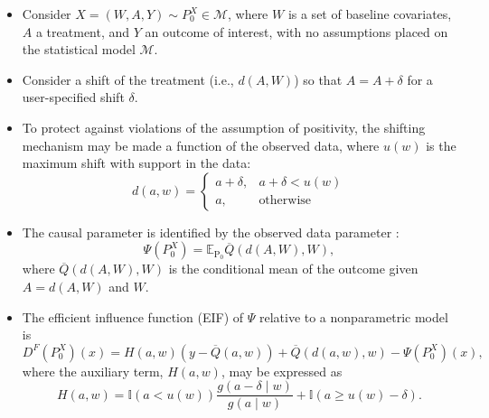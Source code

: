 \documentclass[landscape,a0paper,fontscale=0.285]{baposter} %
\begin{document}
\begin{poster}
{\begin{itemize}
  \itemsep0.75pt
  \item Consider $X = (W, A, Y) \sim P_0^X \in \mathcal{M}$, where $W$ is a set
    of baseline covariates, $A$ a treatment, and $Y$ an outcome of interest,
    with no assumptions placed on the statistical model $\mathcal{M}$.
  \item Consider a shift of the treatment (i.e., $d(A, W)$) so that
    $A = A + \delta$ for a user-specified shift $\delta$.
  \item To protect against violations of the assumption of positivity, the
    shifting mechanism may be made a function of the observed data, where
    $u(w)$ is the maximum shift with support in the data:
    \[ d(a, w) =
       \begin{cases}
         a + \delta, & a + \delta < u(w) \\
         a, & \text{otherwise}
       \end{cases}
    \]
  \item The causal parameter is identified by the observed data parameter
    \cite{munoz2012population}:
    \begin{equation}
      \Psi(P_0^X) = \mathbb{E}_{\text{P}_0}{\overline{Q}(d(A, W), W)},
    \end{equation}
    where $\overline{Q}(d(A, W), W)$ is the conditional mean of the outcome
    given $A = d(A,W)$ and $W$.
  \item The efficient influence function (EIF) of $\Psi$ relative to a
    nonparametric model is
        \begin{equation}
          D^F(P_0^X)(x) = H(a, w)({y - \overline{Q}(a, w)}) +
            \overline{Q}(d(a, w), w) - \Psi(P_0^X)(x),
        \end{equation}
      where the auxiliary term, $H(a,w)$, may be expressed as
        \begin{equation}
          H(a,w) = \mathbb{I}(a < u(w)) \frac{g(a - \delta \mid w)}{g(a \mid w)}
            + \mathbb{I}(a \geq u(w) - \delta).
        \end{equation}
\end{itemize}
}


\end{poster}
\end{document}
